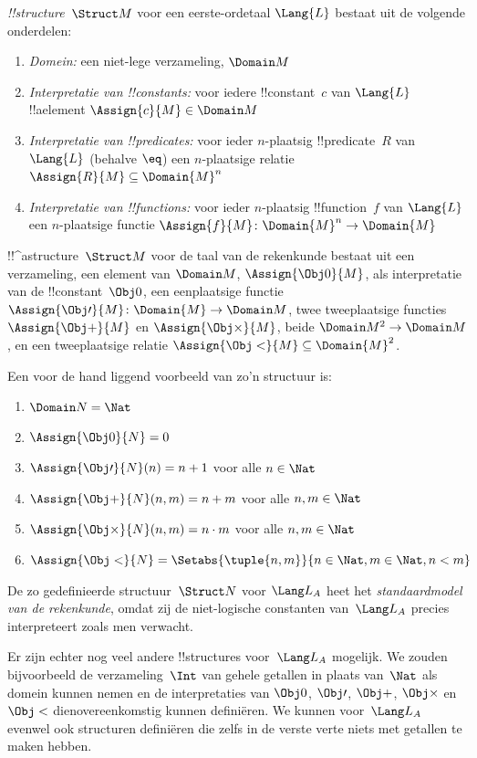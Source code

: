 \documentclass[openany]{memoir}
\begin{document}
\begin{defn}[!!^{structure}s]
 \emph{!!{structure}}~$\Struct M$ voor een
eerste-ordetaal $\Lang{L}$ bestaat uit de volgende onderdelen:
\begin{enumerate}
\item \emph{Domein:} een niet-lege verzameling, $\Domain M$
\item \emph{Interpretatie van !!{constant}s:} voor iedere
  !!{constant}~$c$ van $\Lang{L}$ !!a{element}
  $\Assign{c}{M} \in \Domain M$
\item \emph{Interpretatie van !!{predicate}s:} voor ieder $n$-plaatsig
  !!{predicate}~$R$ van $\Lang{L}$ (behalve $\eq$) een $n$-plaatsige
  relatie $\Assign{R}{M} \subseteq \Domain{M}^n$
\item \emph{Interpretatie van !!{function}s:} voor ieder $n$-plaatsig
  !!{function}~$f$ van $\Lang{L}$ een $n$-plaatsige functie
  $\Assign{f}{M} \colon \Domain{M}^n \to \Domain{M}$
\end{enumerate}
\end{defn}

\begin{ex}
!!^a{structure}~$\Struct M$ voor de taal van de rekenkunde bestaat uit
  een verzameling, een element van $\Domain M$, $\Assign{\Obj 0}{M}$,
  als interpretatie van de !!{constant}~$\Obj 0$, een eenplaatsige functie
  $\Assign{\Obj \prime}{M} \colon \Domain{M} \to \Domain M$, twee
  tweeplaatsige functies $\Assign{\Obj +}{M}$ en $\Assign{\Obj
    \times}{M}$, beide $\Domain M^2 \to \Domain M$, en een
  tweeplaatsige relatie $\Assign{\Obj <}{M} \subseteq \Domain{M}^2$.

Een voor de hand liggend voorbeeld van zo'n structuur is:
\begin{enumerate}
\item $\Domain N = \Nat$
\item $\Assign{\Obj 0}{N} = 0$
\item $\Assign{\Obj \prime}{N}(n) = n + 1$ voor alle $n \in \Nat$
\item $\Assign{\Obj +}{N}(n, m) = n + m$ voor alle $n, m \in \Nat$
\item $\Assign{\Obj \times}{N}(n, m) = n\cdot m$ voor alle $n, m \in \Nat$
\item $\Assign{\Obj <}{N} = \Setabs{\tuple{n, m}}{n \in \Nat, m \in
  \Nat, n < m}$
\end{enumerate}
De zo gedefinieerde structuur~$\Struct N$ voor $\Lang L_A$ heet het
\emph{standaardmodel van de rekenkunde}, omdat zij de niet-logische
constanten van~$\Lang L_A$ precies interpreteert zoals men verwacht.

Er zijn echter nog veel andere !!{structure}s voor~$\Lang L_A$
mogelijk. We zouden bijvoorbeeld de verzameling~$\Int$ van gehele
getallen in plaats van~$\Nat$ als domein kunnen nemen en de
interpretaties van $\Obj 0$, $\Obj \prime$, $\Obj +$, $\Obj \times$ en
$\Obj <$ dienovereenkomstig kunnen definiëren. We kunnen voor~$\Lang
L_A$ evenwel ook structuren definiëren die zelfs in de verste verte
niets met getallen te maken hebben.
\end{ex}
\end{document}

